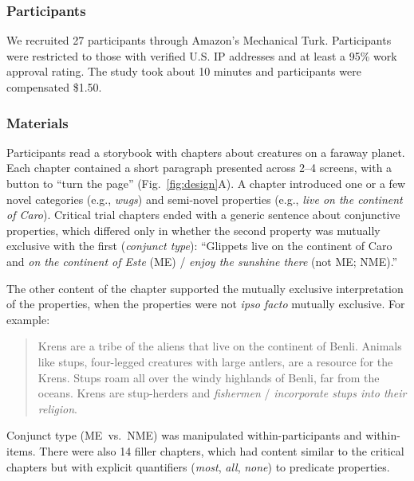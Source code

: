 \documentclass[10pt,letterpaper]{article}
\begin{document}
\subsubsection{Participants}

We recruited 27 participants through Amazon's Mechanical Turk.
Participants were restricted to those with verified U.S. IP addresses and at least a 95\% work approval rating. 
The study took about 10 minutes and participants were compensated \$1.50.

\subsubsection{Materials}

Participants read a storybook with chapters about creatures on a faraway planet.
Each chapter contained a short paragraph presented across 2--4 screens, with a button to ``turn the page'' (Fig.~\ref{fig:design}A).
A chapter introduced one or a few novel categories (e.g., \emph{wugs}) and semi-novel properties (e.g., \emph{live on the continent of Caro}).
Critical trial chapters ended with a generic sentence about conjunctive properties, which differed only in whether the second property was mutually exclusive with the first (\emph{conjunct type}): ``Glippets live on the continent of Caro and \emph{on the continent of Este} (ME) /  \emph{enjoy the sunshine there} (not ME; NME).''

The other content of the chapter supported the mutually exclusive interpretation of the properties, when the properties were not \emph{ipso facto} mutually exclusive. For example: 

\vspace{-0.1cm}
\begin{quote}
\small
Krens are a tribe of the aliens that live on the continent of Benli. Animals like stups, four-legged creatures with large antlers, are a resource for the Krens. Stups roam all over the windy highlands of Benli, far from the oceans. Krens are stup-herders and \emph{fishermen} / \emph{incorporate stups into their religion}.
\end{quote}
\vspace{-0.1cm}


Conjunct type (ME~vs.~NME) was manipulated within-participants and within-items. 
There were also 14 filler chapters, which had content similar to the critical chapters but with explicit quantifiers (\emph{most}, \emph{all}, \emph{none}) to predicate properties. 
\end{document}
